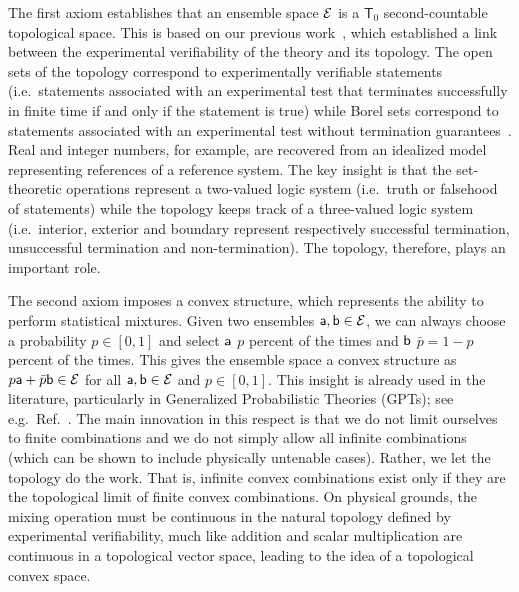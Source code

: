 The first axiom establishes that an ensemble space $\Ens$ is a $\mathsf{T}_0$ second-countable topological space. This is based on our previous work~\cite{aop-book,aop-topExpDisting}, which established a link between the experimental verifiability of the theory and its topology. The open sets of the topology correspond to experimentally verifiable statements (i.e.~statements associated with an experimental test that terminates successfully in finite time if and only if the statement is true) while Borel sets correspond to statements associated with an experimental test without termination guarantees~\cite{aop-book,aop-topExpDisting}. Real and integer numbers, for example, are recovered from an idealized model representing references of a reference system. The key insight is that the set-theoretic operations represent a two-valued logic system (i.e.~truth or falsehood of statements) while the topology keeps track of a three-valued logic system (i.e.~interior, exterior and boundary represent respectively successful termination, unsuccessful termination and non-termination). The topology, therefore, plays an important role.

The second axiom imposes a convex structure, which represents the ability to perform statistical mixtures. Given two ensembles $\ens[a], \ens[b] \in \Ens$, we can always choose a probability $p \in [0,1]$ and select $\ens[a]$ $p$ percent of the times and $\ens[b]$ $\bar{p} = 1-p$ percent of the times. This gives the ensemble space a convex structure as $p \ens[a] + \bar{p} \ens[b] \in \Ens$ for all $\ens[a], \ens[b] \in \Ens$ and $p \in [0,1]$. This insight is already used in the literature, particularly in Generalized Probabilistic Theories (GPTs); see e.g.~Ref.~\cite{plavala2023}. The main innovation in this respect is that we do not limit ourselves to finite combinations and we do not simply allow all infinite combinations (which can be shown to include physically untenable cases). Rather, we let the topology do the work. That is, infinite convex combinations exist only if they are the topological limit of finite convex combinations. On physical grounds, the mixing operation must be continuous in the natural topology defined by experimental verifiability, much like addition and scalar multiplication are continuous in a topological vector space, leading to the idea of a topological convex space.

